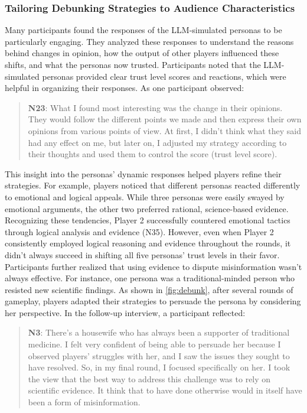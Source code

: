 \subsubsection{Tailoring Debunking Strategies to Audience Characteristics}
Many participants found the responses of the LLM-simulated personas to be particularly engaging. They analyzed these responses to understand the reasons behind changes in opinion, how the output of other players influenced these shifts, and what the personas now trusted. Participants noted that the LLM-simulated personas provided clear trust level scores and reactions, which were helpful in organizing their responses. As one participant observed:
\begin{quote}
    \textbf{N23}:
    What I found most interesting was the change in their opinions. They would follow the different points we made and then express their own opinions from various points of view. At first, I didn’t think what they said had any effect on me, but later on, I adjusted my strategy according to their thoughts and used them to control the score (trust level score).
\end{quote}
This insight into the personas' dynamic responses helped players refine their strategies. For example, players noticed that different personas reacted differently to emotional and logical appeals. While three personas were easily swayed by emotional arguments, the other two preferred rational, science-based evidence. Recognizing these tendencies, Player 2 successfully countered emotional tactics through logical analysis and evidence (N35). However, even when Player 2 consistently employed logical reasoning and evidence throughout the rounds, it didn’t always succeed in shifting all five personas' trust levels in their favor.
Participants further realized that using evidence to dispute misinformation wasn’t always effective. For instance, one persona was a traditional-minded person who resisted new scientific findings. As shown in \autoref{fig:debunk}, after several rounds of gameplay, players adapted their strategies to persuade the persona by considering her perspective. In the follow-up interview, a participant reflected:
\begin{quote}
    \textbf{N3}:
    There's a housewife who has always been a supporter of traditional medicine. I felt very confident of being able to persuade her because I observed players' struggles with her, and I saw the issues they sought to have resolved. So, in my final round, I focused specifically on her. I took the view that the best way to address this challenge was to rely on scientific evidence. It think that to have done otherwise would in itself have been a form of misinformation.
\end{quote}


